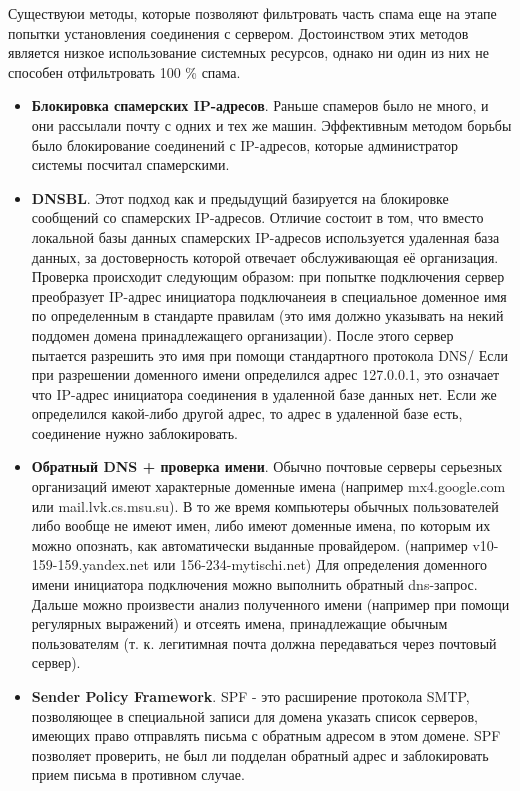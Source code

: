Существуюи методы, которые позволяют фильтровать часть спама еще на этапе попытки установления соединения с сервером. Достоинством этих методов является низкое использование системных ресурсов, однако ни один из них не способен отфильтровать 100 \% спама.
\begin{itemize}
\item \textbf{Блокировка спамерских IP-адресов}. Раньше спамеров было не много, и они рассылали почту с одних и тех же машин. Эффективным методом борьбы было блокирование соединений с IP-адресов, которые администратор системы посчитал спамерскими.

\item \textbf{DNSBL}\cite{MCMILLAN}. Этот подход как и предыдущий базируется на блокировке сообщений со спамерских IP-адресов. Отличие состоит в том, что вместо локальной базы данных спамерских IP-адресов используется удаленная база данных, за достоверность которой отвечает обслуживающая её организация. Проверка происходит следующим образом: при попытке подключения сервер преобразует IP-адрес инициатора подключанеия в специальное доменное имя по определенным в стандарте правилам (это имя должно указывать на некий поддомен домена принадлежащего организации). После этого сервер пытается разрешить это имя при помощи стандартного протокола DNS/ Если при разрешении доменного имени определился адрес 127.0.0.1, это означает что IP-адрес инициатора соединения в удаленной базе данных нет. Если же определился какой-либо другой адрес, то адрес в удаленной базе есть, соединение нужно заблокировать.

\item \textbf{Обратный DNS + проверка имени}. Обычно почтовые серверы серьезных организаций имеют характерные доменные имена (например mx4.google.com или mail.lvk.cs.msu.su). В то же время компьютеры обычных пользователей либо вообще не имеют имен, либо имеют доменные имена, по которым их можно опознать, как автоматически выданные провайдером. (например v10-159-159.yandex.net или 156-234-mytischi.net) Для определения доменного имени инициатора подключения можно выполнить обратный dns-запрос. Дальше можно произвести анализ полученного имени (например при помощи регулярных выражений) и отсеять имена, принадлежащие обычным пользователям (т. к. легитимная почта должна передаваться через почтовый сервер). 

\item \textbf{Sender Policy Framework}. \cite{SPF} SPF - это расширение протокола SMTP\cite{RFC2081}, позволяющее в специальной записи для домена указать список серверов, имеющих право отправлять письма с обратным адресом в этом домене. SPF позволяет проверить, не был ли подделан обратный адрес и заблокировать прием письма в противном случае.
\end{itemize}

